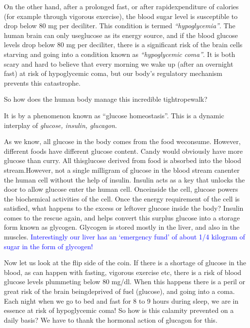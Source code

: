 \vskip 6pt
On the other hand, after a prolonged fast, or after rapid\break expenditure of calories (for example through vigorous exercise), the blood sugar level is susceptible to drop below 80 mg per deciliter. This condi\-tion is termed \textit{“hypoglycemia”}. The human brain can only use\break glucose as its energy source, and if the blood glucose levels drop below 80 mg per deciliter, there is a significant risk of the brain cells star\-ving and going into a condition known as \textit{“hypoglycemic coma”}. It is both scary and hard to believe that every morning we wake up (after an overnight fast) at risk of hypoglycemic coma, but our body’s regulatory mechanism prevents this catastrophe.

\vskip 6pt
So how does the human body manage this incredible tightrope\break walk?

\vskip 6pt
It is by a phenomenon known as “glucose homeostasis”. This is a dynamic interplay of \textit{glucose, insulin, glucagon}.

\vskip 6pt
As we know, all glucose in the body comes from the food we\break consume. However, different foods have different glucose content. Candy would obviously have more glucose than curry. All this\break glucose derived from food is absorbed into the blood stream.\break However, not a single milligram of glucose in the blood stream can\break enter the human cell without the help of insulin. Insulin acts as a key that unlocks the door to allow glucose enter the human cell. Once\break inside the cell, glucose powers the biochemical activities of the cell. Once the energy requirement of the cell is satisfied, what happens to the excess or leftover glucose inside the body? Insulin comes to the rescue again, and helps convert this surplus glucose into a storage form known as glycogen. Glycogen is stored mostly in the liver, and also in the muscles. \textcolor{blue}{Interestingly our liver has an ‘emergency fund’ of about 1/4 kilogram of sugar in the form of glycogen!}

\vskip 6pt
Now let us look at the flip side of the coin. If there is a shortage of glucose in the blood, as can happen with fasting, vigorous exercise etc, there is a risk of blood glucose levels plummeting below 80 mg/dl. When this happens there is a peril or great risk of the brain being\break deprived of fuel (glucose), and going into a coma. Each night when we go to bed and fast for 8 to 9 hours during sleep, we are in essence at risk of hypoglycemic coma! So how is this calamity prevented on a daily basis? We have to thank the hormonal action of glucagon for this.

